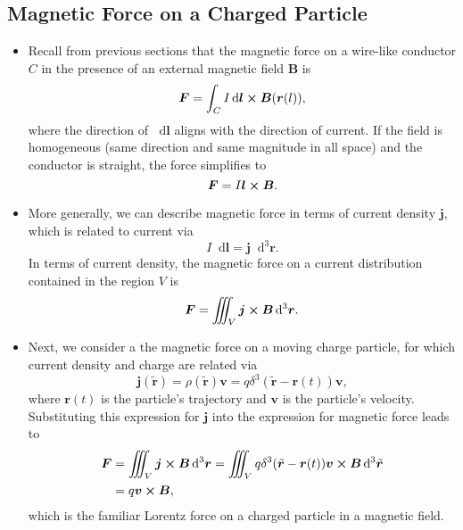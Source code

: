 \documentclass[11pt, a4paper]{article}
\newcommand{\diff}{\mathop{}\!\mathrm{d}} %
\newcommand{\dr}{\diff^{3} \r}  %
\newcommand{\dtr}{\diff^{3} \tilde{\r}}  %
\renewcommand{\vec}[1]{\bm{#1}} %
\renewcommand{\t}[1]{\tilde{#1}} %
\renewcommand{\r}{\vec{r}}
\newcommand{\B}{\vec{B}} %
\renewcommand{\j}{\vec{j}}  %
\begin{document}
\subsection{Magnetic Force on a Charged Particle}
\begin{itemize}
	\item Recall from previous sections that the magnetic force on a wire-like conductor $ C $ in the presence of an external magnetic field $ \B $ is
	\begin{equation*}
		\vec{F} = \int_{C} I \diff \vec{l} \cross \vec{B}(\r(l)),
	\end{equation*}
	where the direction of $ \diff \vec{l} $ aligns with the direction of current. If the field is homogeneous (same direction and same magnitude in all space) and the conductor is straight, the force simplifies to
	\begin{equation*}
		\vec{F} = I \vec{l} \cross \vec{B}.
	\end{equation*}
	
	\item More generally, we can describe magnetic force in terms of current density $ \j $, which is related to current via
	\begin{equation*}
		I \diff \vec{l} = \vec{j} \dr.
	\end{equation*}
    In terms of current density, the magnetic force on a current distribution contained in the region $ V $ is
	\begin{equation*}
		\vec{F} = \iiint_{V} \vec{j} \cross \vec{B} \dr.
	\end{equation*}
	
	\item Next, we consider a the magnetic force on a moving charge particle, for which current density and charge are related via
	\begin{equation*}
		\vec{j}(\t{\r}) = \rho(\t{\r}) \vec{v} = q \delta^{3}(\t{\r} - \r(t))\vec{v},
	\end{equation*}
	where $ \r(t) $ is the particle's trajectory and $ \vec{v} $ is the particle's velocity. Substituting this expression for $ \j $ into the expression for magnetic force leads to
	\begin{align*}
		\vec{F} &= \iiint_{V} \j \cross \B \dr = \iiint_{V} q \delta^{3}(\t{\r} - \r(t))\vec{v} \cross \B \dtr\\
		& = q \vec{v} \cross \B,
	\end{align*}
    which is the familiar Lorentz force on a charged particle in a magnetic field.
	
\end{itemize}
\end{document}
